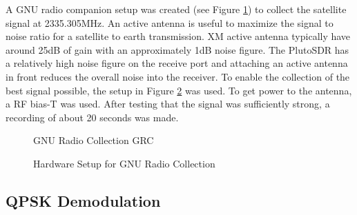 \documentclass[conference,onecolumn]{IEEEtran}
\begin{document}
A GNU radio companion setup was created (see Figure \ref{fig::gnu_collect}) to collect the satellite signal at 2335.305MHz.  An active antenna is useful to maximize the signal to noise ratio for a satellite to earth transmission.  XM active antenna typically have around 25dB of gain with an approximately 1dB  noise figure.  The PlutoSDR has a relatively high noise figure on the receive port and attaching an active antenna in front reduces the overall noise into the receiver.  To enable the collection of the best signal possible, the setup in Figure \ref{fig::gnu_hardware} was used.  To get power to the antenna, a RF bias-T was used.  After testing that the signal was sufficiently strong, a recording of about 20 seconds was made.
\begin{figure}[H]
	\centerline{}
	\caption{GNU Radio Collection GRC}
	\label{fig::gnu_collect}
\end{figure}
\begin{figure}[H]
	\centerline{}
	\caption{Hardware Setup for GNU Radio Collection}
	\label{fig::gnu_hardware}
\end{figure}


\subsection{QPSK Demodulation}
\end{document}
